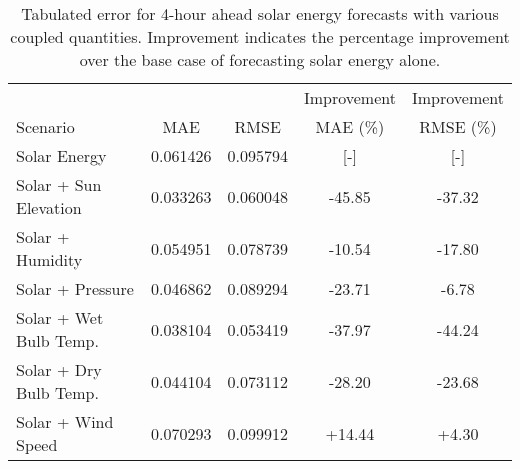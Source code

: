   \begin{table*}[b]
    \centering
    \caption{Tabulated error for 4-hour ahead solar energy forecasts with various coupled quantities. Improvement indicates the percentage improvement over the base case of forecasting solar energy alone.}
    \label{tab:solar04}
    \begin{tabular}{l|c|c|c|c}
      &  & & Improvement & Improvement \\
      Scenario  & MAE & RMSE & MAE (\%) & RMSE (\%)\\
      \hline
      Solar Energy & 0.061426 & 0.095794 & [-] & [-] \\
      Solar + Sun Elevation & 0.033263 & 0.060048 & -45.85 & -37.32\\
      Solar + Humidity & 0.054951 & 0.078739 & -10.54& -17.80\\
      Solar + Pressure & 0.046862 & 0.089294 & -23.71& -6.78\\
      Solar + Wet Bulb Temp. & 0.038104 & 0.053419 & -37.97& -44.24\\
      Solar + Dry Bulb Temp. & 0.044104 & 0.073112 & -28.20& -23.68\\
      Solar + Wind Speed & 0.070293 & 0.099912 & +14.44& +4.30\\
    \end{tabular}
  \end{table*}
